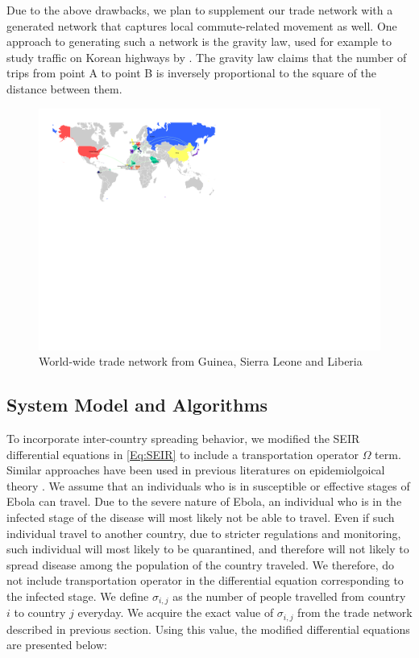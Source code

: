 \documentclass[10pt, journal,onecolumn]{IEEEtran}
\begin{document}
Due to the above drawbacks, we plan to supplement our trade network with a generated network that
captures local commute-related movement as well. One approach to generating such a network is the gravity law,
used for example to study traffic on Korean highways by \citep{jung2008gravity}. The gravity law
claims that the number of trips from point A to point B is inversely proportional to the square
of the distance between them.

\begin{figure}[ht]
\centering
\includegraphics[scale=1.1]{world1.pdf}
\caption{World-wide trade network from Guinea, Sierra Leone and Liberia}
\label{Fig:worldtrade}
\end{figure}


\subsection{{System Model and Algorithms}}
\label{SubSec:WorldSystem}

To incorporate inter-country spreading behavior, we modified the SEIR differential equations in \eqref{Eq:SEIR} to include a transportation operator $\Omega$ term. Similar approaches have been used in previous literatures on epidemiolgoical theory \citep{grais2003assessing, balcan2010modeling}. We assume that an individuals who is in susceptible or effective stages of Ebola can travel. Due to the severe nature of Ebola, an individual who is in the infected stage of the disease will most likely not be able to travel. Even if such individual travel to another country, due to stricter regulations and monitoring, such individual will most likely to be quarantined, and therefore will not likely to spread disease among the population of the country traveled. We therefore, do not  include transportation operator in the differential equation corresponding to the infected stage. We define $\sigma_{i,j}$ as the number of people travelled from country $i$ to country $j$ everyday. We acquire the exact value of  $\sigma_{i,j}$ from the trade network described in previous section.  Using this value, the modified differential equations are presented below:
\end{document}
